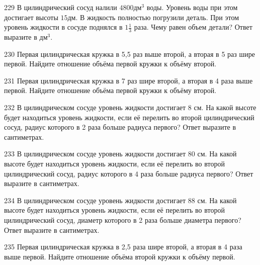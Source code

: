 \documentclass[4apaper]{article}
\begin{document}
\begin{taskBN}{229}
В цилиндрический сосуд налили $4800\mbox{дм}^3$ воды. Уровень воды при этом достигает высоты $15$дм. В жидкость полностью погрузили деталь. При этом уровень жидкости в сосуде поднялся в ${1}\frac{1}{3}$ раза. Чему равен объем детали? Ответ выразите в $\mbox{дм}^3$.
\end{taskBN}

\begin{taskBN}{230}
 Первая цилиндрическая кружка в 5,5 раз выше второй, а вторая в 5 раз шире первой. Найдите отношение объёма первой кружки к объёму второй.
\end{taskBN}

\begin{taskBN}{231}
 Первая цилиндрическая кружка в 7 раз шире второй, а вторая в 4 раза выше первой. Найдите отношение объёма первой кружки к объёму второй.
\end{taskBN}

\begin{taskBN}{232}
В цилиндрическом сосуде уровень жидкости достигает 8 см. На какой высоте будет находиться уровень жидкости, если её перелить во второй цилиндрический сосуд, радиус которого в 2 раза больше радиуса первого? Ответ выразите в сантиметрах.
\end{taskBN}

\begin{taskBN}{233}
В цилиндрическом сосуде уровень жидкости достигает 80 см. На какой высоте будет находиться уровень жидкости, если её перелить во второй цилиндрический сосуд, радиус которого в 4 раза больше радиуса первого? Ответ выразите в сантиметрах.
\end{taskBN}

\begin{taskBN}{234}
В цилиндрическом сосуде уровень жидкости достигает 88 см. На какой высоте будет находиться уровень жидкости, если её перелить во второй цилиндрический сосуд, диаметр которого в 2 раза больше диаметра первого? Ответ выразите в сантиметрах.
\end{taskBN}

\begin{taskBN}{235}
 Первая цилиндрическая кружка в 2,5 раза шире второй, а вторая в 4 раза выше первой. Найдите отношение объёма второй кружки к объёму первой.
\end{taskBN}
\end{document}
